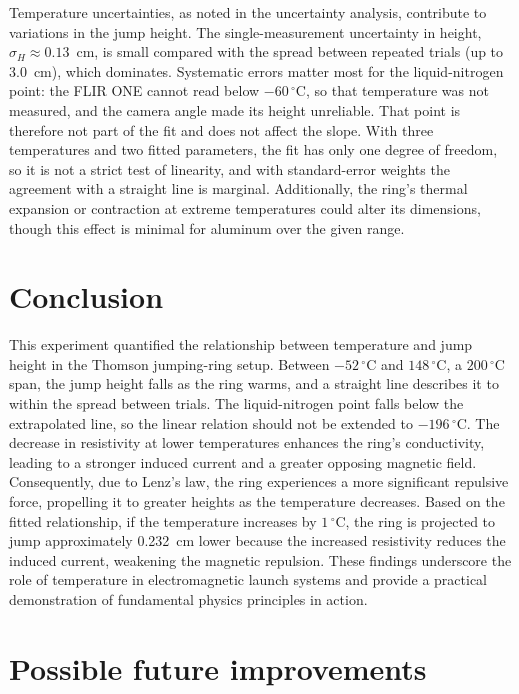\documentclass[11pt]{article}
\newcommand{\tC}[1]{$#1\,^{\circ}\mathrm{C}$}
\begin{document}
Temperature uncertainties, as noted in the uncertainty analysis, contribute to variations in the
jump height. The single-measurement uncertainty in height, $\sigma_H \approx 0.13$~cm, is small compared with
the spread between repeated trials (up to 3.0~cm), which dominates. Systematic errors matter most
for the liquid-nitrogen point: the FLIR ONE cannot read below \tC{-60}, so that temperature was not
measured, and the camera angle made its height unreliable. That point is therefore not part of the
fit and does not affect the slope. With three temperatures and two fitted parameters, the fit has
only one degree of freedom, so it is not a strict test of linearity, and with standard-error weights the agreement with a
straight line is marginal. Additionally, the ring's thermal expansion or contraction at
extreme temperatures could alter its dimensions, though this effect is minimal for aluminum over
the given range.

\section*{Conclusion}

This experiment quantified the relationship between temperature and jump height in the Thomson
jumping-ring setup. Between \tC{-52} and \tC{148}, a \tC{200} span, the jump height falls as the ring warms, and a straight line describes it to within the spread
between trials. The liquid-nitrogen point falls below the extrapolated line, so the linear
relation should not be extended to \tC{-196}. The decrease in resistivity at lower temperatures
enhances the ring's conductivity, leading to a stronger induced current and a greater opposing
magnetic field. Consequently, due to Lenz's law, the ring experiences a more significant repulsive
force, propelling it to greater heights as the temperature decreases. Based on the fitted
relationship, if the temperature increases by \tC{1}, the ring is projected to jump approximately
0.232~cm lower because the increased resistivity reduces the induced current, weakening the
magnetic repulsion. These findings underscore the role of temperature in electromagnetic launch
systems and provide a practical demonstration of fundamental physics principles in action.

\section*{Possible future improvements}
\end{document}
